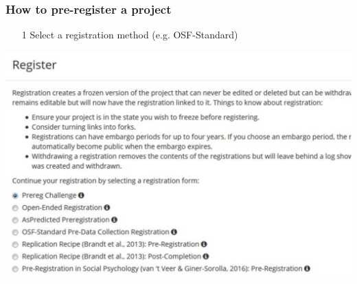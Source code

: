 \documentclass{beamer}
\begin{document}
\begin{frame}
\frametitle{How to pre-register a project}
\begin{itemize}
	\item[1] Select a registration method (e.g. OSF-Standard)
\end{itemize}
\begin{center}
\includegraphics[scale=0.4]{prereg4.pdf}
\end{center}
\end{frame}
\end{document}
